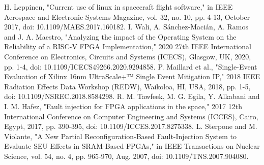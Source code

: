 \documentclass[conference]{IEEEtran}
\begin{document}
\begin{thebibliography}{10}
     H. Leppinen, "Current use of linux in spacecraft flight software," in IEEE Aerospace and Electronic Systems Magazine,
     vol. 32, no. 10, pp. 4-13, October 2017, doi: 10.1109/MAES.2017.160182. 
     I. Wali, A. Sánchez-Macián, A. Ramos and J. A. Maestro, "Analyzing the impact of the Operating System on the Reliability
     of a RISC-V FPGA Implementation," 2020 27th IEEE International Conference on Electronics, Circuits and Systems (ICECS), Glasgow, UK, 2020,
    pp. 1-4, doi: 10.1109/ICECS49266.2020.9294858.
     P. Maillard et al., "Single-Event Evaluation of Xilinx 16nm UltraScale+™ Single Event Mitigation IP," 2018 IEEE Radiation 
     Effects Data Workshop (REDW), Waikoloa, HI, USA, 2018, pp. 1-5, doi: 10.1109/NSREC.2018.8584298.
     R. M. Tawfeek, M. G. Egila, Y. Alkabani and I. M. Hafez, "Fault injection for FPGA applications in the space," 2017 12th
     International Conference on Computer Engineering and Systems (ICCES), Cairo, Egypt, 2017, pp. 390-395, doi: 10.1109/ICCES.2017.8275338.
     L. Sterpone and M. Violante, "A New Partial Reconfiguration-Based Fault-Injection System to Evaluate SEU Effects in SRAM-Based
     FPGAs," in IEEE Transactions on Nuclear Science, vol. 54, no. 4, pp. 965-970, Aug. 2007, doi: 10.1109/TNS.2007.904080.
    
\end{thebibliography}
\end{document}
